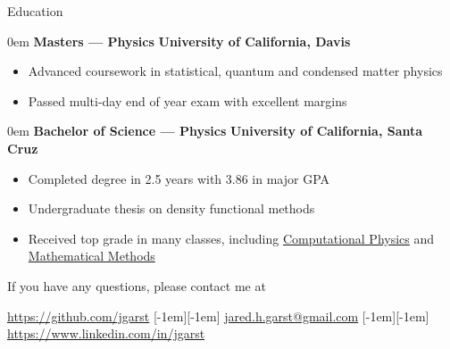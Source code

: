 \documentclass[11pt,a4paper]{article}
\newenvironment{headedsection}[2]{
    \begin{addmargin}[0.5em]{0em}
    {\large\bfseries #1} \hfill {\bfseries #2}%
    \begin{itemize}
        [label={}, topsep=0pt, itemsep=1.5pt, parsep=0pt, leftmargin=1.5em]
}{
    \end{itemize}
    \end{addmargin}
    \medskip
}
\newcommand*\sbull{%
    \raisebox{-0.550ex}[-1em][-1em]{\textscale{4}{\( \cdot \)}}\xspace
}
\begin{document}
\begin{mysection}{Education}
    \begin{headedsection}{Masters --- Physics}
          {University of California, Davis}

        \item Advanced coursework in statistical, quantum and condensed matter
            physics
        \item Passed multi-day end of year exam with excellent margins
    \end{headedsection}

    \begin{headedsection}{Bachelor of Science --- Physics}
          {University of California, Santa Cruz}

        \item Completed degree in 2.5 years with 3.86 in major GPA
        \item Undergraduate thesis on density functional methods
        \item Received top grade in many classes, including 
            \href{http://young.physics.ucsc.edu/115/}{Computational Physics}
            and
            \href{http://scipp.ucsc.edu/~haber/ph116C/}{Mathematical Methods}
    \end{headedsection}
\end{mysection}

\vfill

\begin{center}
    If you have any questions, please contact me at
\end{center}

\begin{center}
    \href{https://github.com/jgarst}{https://github.com/jgarst} 
    \sbull{} 
    \href{jared.h.garst@gmail.com}{jared.h.garst@gmail.com} 
    \sbull{} 
    \href{https://www.linkedin.com/in/jgarst}
        {https://www.linkedin.com/in/jgarst}
\end{center}
\end{document}
